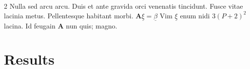 \documentclass{article}
\begin{document}
\begin{multicols}{2}
Nulla sed arcu arcu. Duis et ante gravida orci venenatis tincidunt. Fusce vitae lacinia metus. Pellentesque habitant morbi. $\mathbf{A}\underline{\xi}=\underline{\beta}$ Vim $\underline{\xi}$ enum nidi $3(P+2)^{2}$ lacina. Id feugain $\mathbf{A}$ nun quis; magno.






\section*{Results}



\end{multicols}
\end{document}
